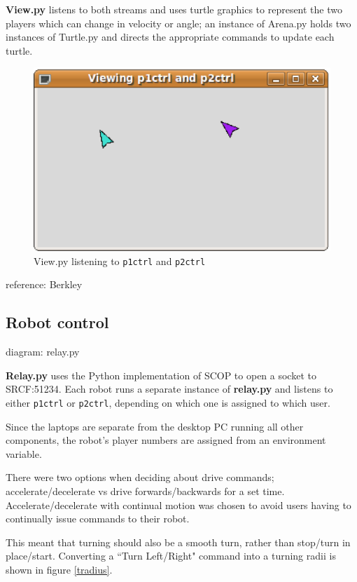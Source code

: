 \documentclass[12pt,a4,notitlepage]{report}
\renewcommand{\_}{\texttt{\symbol{95}}}
\newcommand{\<}{\texttt{\symbol{60}}}
\renewcommand{\>}{\texttt{\symbol{62}}}
\newcommand{\class}[1]{\textbf{#1}}
\newcommand{\scopendpoint}[1]{\texttt{#1}}
\begin{document}
{\class{View.py} listens to both streams and uses turtle graphics to represent the two players which can change in velocity or angle; an instance of Arena.py holds two instances of Turtle.py and directs the appropriate commands to update each turtle.

\begin{figure}[hb]
\centering
\includegraphics[scale=0.5,angle=0]{images/View.ps}
\caption{View.py listening to \scopendpoint{p1ctrl} and \scopendpoint{p2ctrl}}
\label{control}
\end{figure}

{reference: Berkley}

\subsection{Robot control}

{diagram: relay.py}

\class{Relay.py} uses the Python implementation of SCOP to open a socket to SRCF:51234. Each robot runs a separate instance of \class{relay.py} and listens to either \scopendpoint{p1ctrl} or \scopendpoint{p2ctrl}, depending on which one is assigned to which user. 

Since the laptops are separate from the desktop PC running all other components, the robot's player numbers are assigned from an environment variable.

There were two options when deciding about drive commands; accelerate/decelerate vs drive forwards/backwards for a set time. Accelerate/decelerate with continual motion was chosen to avoid users having to continually issue commands to their robot.

This meant that turning should also be a smooth turn, rather than stop/turn in place/start. Converting a ``Turn Left/Right" command into a turning radii is shown in figure \ref{tradius}.

}
\end{document}
